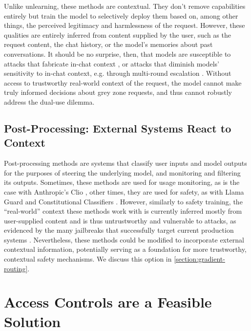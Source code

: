 \documentclass{article}
\theoremstyle{plain}
\theoremstyle{definition}
\theoremstyle{remark}
\begin{document}
Unlike unlearning, these methods are contextual.
They don't remove capabilities entirely but train the model to selectively deploy them based on, among other things, the perceived legitimacy and harmlessness of the request.
However, these qualities are entirely inferred from content supplied by the user, such as the request content, the chat history, or the model's memories about past conversations.
It should be no surprise, then, that models are susceptible to attacks that fabricate in-chat context \cite{zeng2024johnnypersuadellmsjailbreak}, or attacks that diminish models' sensitivity to in-chat context, e.g. through multi-round escalation \cite{russinovich2025greatwritearticlethat}.
Without access to trustworthy real-world context of the request, the model cannot make truly informed decisions about grey zone requests, and thus cannot robustly address the dual-use dilemma.

\subsection{Post-Processing: External Systems React to Context}

Post-processing methods are systems that classify user inputs and model outputs for the purposes of steering the underlying model, and monitoring and filtering its outputs.
Sometimes, these methods are used for usage monitoring, as is the case with Anthropic's Clio \cite{tamkin2024clioprivacypreservinginsightsrealworld, handa2025economictasksperformedai}, other times, they are used for safety, as with Llama Guard \cite{inan2023llamaguardllmbasedinputoutput} and Constitutional Classifiers \cite{sharma2025constitutionalclassifiersdefendinguniversal}.
However, similarly to safety training, the ``real-world'' context these methods work with is currently inferred mostly from user-supplied content and is thus untrustworthy and vulnerable to attacks, as evidenced by the many jailbreaks that successfully target current production systems \cite{zhang2025outputconstraintsattacksurface}.
Nevertheless, these methods could be modified to incorporate external contextual information, potentially serving as a foundation for more trustworthy, contextual safety mechanisms. We discuss this option in \cref{section:gradient-routing}.

\section{Access Controls are a Feasible Solution}
\label{section:access-controls}
\end{document}
